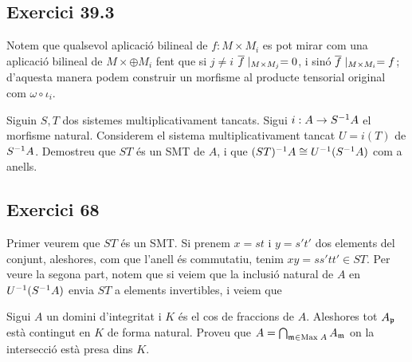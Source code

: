 \documentclass[11pt, a4paper]{article}
\begin{document}
\subsection{Exercici 39.3}
\begin{center}
\end{center}
Notem que qualsevol aplicació bilineal de $f:M\times M_i$ es pot mirar com una aplicació bilineal de $M\times\oplus M_i$ fent que si $j\neq i$ $\overline f\mid_{M\times M_j}=0$, i sinó $\overline f\mid_{M\times M_i} = f$; d'aquesta manera podem construir un morfisme al producte tensorial original com $\omega\circ\iota_i$.
\newpage
\begin{tcolorbox}[title=\section{Exercici 68}]
    Siguin $S,T$ dos sistemes multiplicativament tancats. Sigui $i:A\to S^{-1} A$ el morfisme natural. Considerem el sistema multiplicativament tancat $U=i(T)$ de $S^{-1} A$. Demostreu que $ST$ és un SMT de $A$, i que $(ST)^{-1} A\cong U^{-1}(S^{-1} A)$ com a anells.
\end{tcolorbox}
\subsection{Exercici 68}
Primer veurem que $ST$ és un SMT. Si prenem $x= st$ i $y= s't'$ dos elements del conjunt, aleshores, com que l'anell és commutatiu, tenim $xy = ss'tt'\in ST$. Per veure la segona part, notem que si veiem que la inclusió natural de $A$ en $U^{-1}(S^{-1} A)$ envia $ST$ a elements invertibles, i veiem que 
\newpage
\begin{tcolorbox}[title=\section{Exercici 70}]
    Sigui $A$ un domini d'integritat i $K$ és el cos de fraccions de $A$. Aleshores tot $A_\mathfrak p$ està contingut en $K$ de forma natural. Proveu que $A=\bigcap_{\mathfrak m\in \mathrm{Max}\; A}A_\mathfrak m$ on la intersecció està presa dins $K$. 
\end{tcolorbox}
\end{document}
